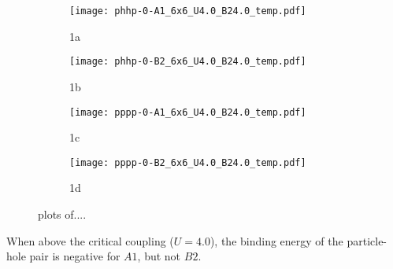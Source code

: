 \begin{figure}
    \begin{subfigure}{.5\textwidth}
      \centering
      \texttt{[image: phhp-0-A1\_6x6\_U4.0\_B24.0\_temp.pdf]}
      \caption{1a}
      \label{fig:sfig1}
    \end{subfigure}%
    \begin{subfigure}{.5\textwidth}
      \centering
      \texttt{[image: phhp-0-B2\_6x6\_U4.0\_B24.0\_temp.pdf]}
      \caption{1b}
      \label{fig:sfig2}
    \end{subfigure}
    \begin{subfigure}{.5\textwidth}
        \centering
        \texttt{[image: pppp-0-A1\_6x6\_U4.0\_B24.0\_temp.pdf]}
        \caption{1c}
        \label{fig:sfig3}
    \end{subfigure}
    \begin{subfigure}{.5\textwidth}
        \centering
        \texttt{[image: pppp-0-B2\_6x6\_U4.0\_B24.0\_temp.pdf]}
        \caption{1d}
        \label{fig:sfig4}
    \end{subfigure}
    \caption{plots of....}
    \label{fig:u4temp}
  \end{figure}
When above the critical coupling ($U=4.0$), the binding energy of the particle-hole pair is negative for $A1$, but not $B2$. 




